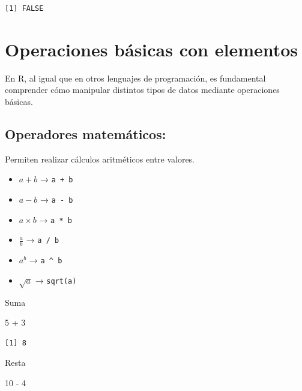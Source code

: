 \documentclass[
  letterpaper,
  DIV=11,
  numbers=noendperiod,
  twoside]{scrreprt}
\newenvironment{Shaded}{\begin{snugshade}}{\end{snugshade}}
\newcommand{\DecValTok}[1]{\textcolor[rgb]{0.68,0.00,0.00}{#1}}
\newcommand{\SpecialCharTok}[1]{\textcolor[rgb]{0.37,0.37,0.37}{#1}}
\providecommand{\tightlist}{%
  \setlength{\itemsep}{0pt}\setlength{\parskip}{0pt}}\usepackage{longtable,booktabs,array}
\begin{document}
\begin{verbatim}
[1] FALSE
\end{verbatim}

\section{Operaciones básicas con
elementos}\label{operaciones-buxe1sicas-con-elementos}

En R, al igual que en otros lenguajes de programación, es fundamental
comprender cómo manipular distintos tipos de datos mediante operaciones
básicas.

\subsection{Operadores matemáticos:}\label{operadores-matemuxe1ticos}

Permiten realizar cálculos aritméticos entre valores.

\begin{itemize}
\tightlist
\item
  \(a + b\) → \texttt{a\ +\ b}\\
\item
  \(a - b\) → \texttt{a\ -\ b}\\
\item
  \(a \times b\) → \texttt{a\ *\ b}\\
\item
  \(\frac{a}{b}\) → \texttt{a\ /\ b}\\
\item
  \(a^b\) → \texttt{a\ \^{}\ b}\\
\item
  \(\sqrt{a}\) → \texttt{sqrt(a)}
\end{itemize}

Suma

\begin{Shaded}
\begin{Highlighting}[]
\DecValTok{5} \SpecialCharTok{+} \DecValTok{3}
\end{Highlighting}
\end{Shaded}

\begin{verbatim}
[1] 8
\end{verbatim}

Resta

\begin{Shaded}
\begin{Highlighting}[]
\DecValTok{10} \SpecialCharTok{{-}} \DecValTok{4}
\end{Highlighting}
\end{Shaded}
\end{document}
